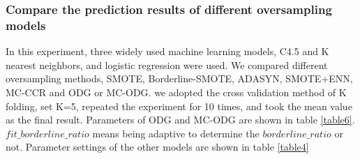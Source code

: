 \documentclass[runningheads]{llncs}
\begin{document}
\subsubsection{Compare the prediction results of different oversampling models}
In this experiment, three widely used machine learning models, C4.5 and K nearest neighbors, and logistic regression were used.
We compared different oversampling methods, SMOTE, Borderline-SMOTE, ADASYN, SMOTE+ENN, MC-CCR and ODG or MC-ODG.
we adopted the cross validation method of K folding, set K=5, repeated the experiment for 10 times, and took the mean value as the final result.
Parameters of ODG and MC-ODG are shown in table \ref{table6}.
$fit\_borderline\_ratio$ means being adaptive to determine the $borderline\_ratio$ or not.
Parameter settings of the other models are shown in table \ref{table4}
\begin{table}[htbp]
    \caption{Parameters}
    \label{table4}
    \centering
\end{table}
\end{document}
